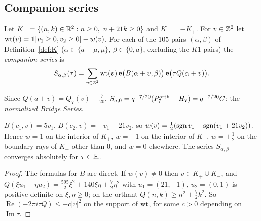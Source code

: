 \subsection{Companion series}
\begin{definition}\label{def:companion}
Let $K_+=\{(n,k)\in\mathbb{R}^2:n\ge0,\ n+21k\ge0\}$ and $K_-=-K_+$. For $v\in\mathbb{Z}^2$ let $\operatorname{wt}(v)=\mathbf 1[v_1\ge0,v_2\ge0]-w(v)$. For each of the $105$ pairs
$(\alpha,\beta)$ of Definition~\ref{def:K} ($\alpha\in\{a+\mu,\mu\}$, $\beta\in\{0,a\}$, excluding the $K1$ pairs) the \emph{companion series} is
\[
S_{\alpha,\beta}(\tau)=\sum_{v\in\mathbb{Z}^2}\operatorname{wt}(v)\,\mathbf{e}\bigl(B(\alpha+v,\beta)\bigr)\,\mathbf{e}\bigl(\tau Q(\alpha+v)\bigr).
\]
\end{definition}
Since $Q(a+v)=Q_7(v)-\tfrac7{20}$, $S_{a,0}=q^{-7/20}(P^{\mathrm{orth}}_7-H_7)=q^{-7/20}C$: the \emph{normalized Bridge Series}.
\begin{lemma}[Weights]\label{lem:weights}
$B(c_1,v)=5v_1$, $B(c_2,v)=-v_1-21v_2$, so $w(v)=\tfrac12(\operatorname{sgn} v_1+\operatorname{sgn}(v_1+21v_2))$. Hence $w=1$ on the interior of $K_+$, $w=-1$ on the interior of
$K_-$, $w=\pm\tfrac12$ on the boundary rays of $K_\pm$ other than $0$, and $w=0$ elsewhere. The series $S_{\alpha,\beta}$ converges absolutely for $\tau\in\mathbb{H}$.
\end{lemma}
\begin{proof}
The formulas for $B$ are direct. If $w(v)\ne0$ then $v\in K_+\cup K_-$, and $Q(\xi u_1+\eta u_2)=\tfrac{595}2\xi^2+140\xi\eta+\tfrac72\eta^2$ with
$u_1=(21,-1)$, $u_2=(0,1)$ is positive definite on $\xi,\eta\ge0$; on the orthant $Q(n,k)\ge n^2+\tfrac72k^2$. So $\operatorname{Re}(-2\pi i\tau Q)\le-c|v|^2$
on the support of $\operatorname{wt}$, for some $c>0$ depending on $\operatorname{Im}\tau$.
\end{proof}

